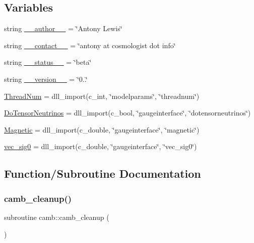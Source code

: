 \subsection*{Variables}
\begin{DoxyCompactItemize}
\item 
string \mbox{\hyperlink{namespacecamb_a85cc16a2fbdb270667e7303f2290c3be}{\+\_\+\+\_\+author\+\_\+\+\_\+}} = \char`\"{}Antony Lewis\char`\"{}
\item 
string \mbox{\hyperlink{namespacecamb_af9e02319cf919d4505eab8b37179c712}{\+\_\+\+\_\+contact\+\_\+\+\_\+}} = \char`\"{}antony at cosmologist dot info\char`\"{}
\item 
string \mbox{\hyperlink{namespacecamb_aa9d4ea4f20e0977e7d5f5dc20b8debd6}{\+\_\+\+\_\+status\+\_\+\+\_\+}} = \char`\"{}beta\char`\"{}
\item 
string \mbox{\hyperlink{namespacecamb_a68e3f34837e39bb6f7e725612e4627fa}{\+\_\+\+\_\+version\+\_\+\+\_\+}} = \char`\"{}0..\char`\"{}
\item 
\mbox{\hyperlink{namespacecamb_a8dcf37e78d4e08b70f90002000e746b8}{Thread\+Num}} = dll\+\_\+import(c\+\_\+int, \char`\"{}modelparams\char`\"{}, \char`\"{}threadnum\char`\"{})
\item 
\mbox{\hyperlink{namespacecamb_af98223967f3787053d42644a1ae6f785}{Do\+Tensor\+Neutrinos}} = dll\+\_\+import(c\+\_\+bool, \char`\"{}gaugeinterface\char`\"{}, \char`\"{}dotensorneutrinos\char`\"{})
\item 
\mbox{\hyperlink{namespacecamb_a61a5837f54fb09c486d29171a8651a91}{Magnetic}} = dll\+\_\+import(c\+\_\+double, \char`\"{}gaugeinterface\char`\"{}, \char`\"{}magnetic\char`\"{})
\item 
\mbox{\hyperlink{namespacecamb_a2e33f06925cf79f62b6d07d7c737217c}{vec\+\_\+sig0}} = dll\+\_\+import(c\+\_\+double, \char`\"{}gaugeinterface\char`\"{}, \char`\"{}vec\+\_\+sig0\char`\"{})
\end{DoxyCompactItemize}


\subsection{Function/\+Subroutine Documentation}
\mbox{\label{namespacecamb_a70f3206a0056ea3ff96defbc4d2be548}} 
\subsubsection{\texorpdfstring{camb\+\_\+cleanup()}{camb\_cleanup()}}
{\footnotesize\ttfamily subroutine camb\+::camb\+\_\+cleanup (\begin{DoxyParamCaption}{ }\end{DoxyParamCaption})}



